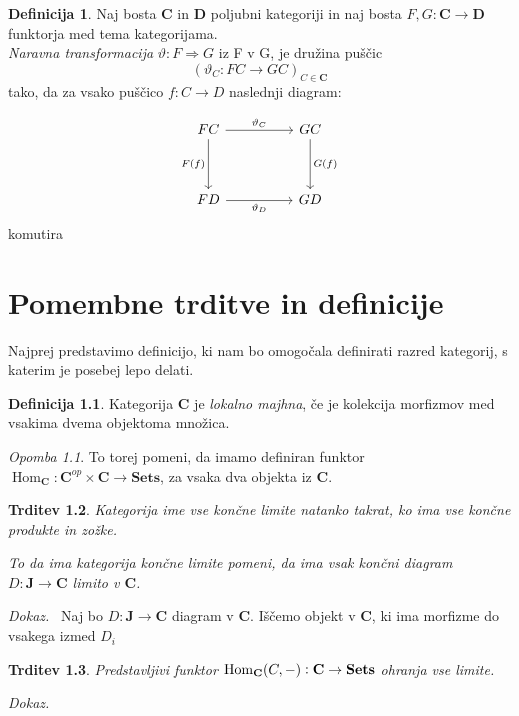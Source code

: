 \documentclass[12pt,a4paper]{book}
\theoremstyle{definition}
\newtheorem{definicija}{Definicija}[chapter]
\theoremstyle{plain}
\newtheorem{trditev}[definicija]{Trditev}
\newenvironment{dokaz}{\emph{Dokaz.}\ }{\hspace{\fill}{$\Box$}}
\theoremstyle{definition}
\theoremstyle{remark}
\newtheorem*{opomba}{Opomba}
\newcommand{\cat}[1]{\textbf{#1}}
\DeclareMathOperator{\Hom}{Hom}
\begin{document}
\begin{definicija}
Naj bosta $\cat{C}$ in $\cat{D}$ poljubni kategoriji in naj bosta $F,G : \cat{C} \to \cat{D}$ funktorja med tema kategorijama. \\
\textit{Naravna transformacija} $\vartheta : F \Rightarrow G$ iz F v G, je družina puščic 
$$(\vartheta_C : FC \to GC)_{C \in \cat{C}}$$
tako, da za vsako puščico $f : C \to D$ naslednji diagram:

\begin{equation}
\begin{tikzcd}[sep=huge]
FC \arrow[r, "\vartheta_C"] \arrow[d, "F(f)"'] & GC \arrow[d, "G(f)"] \\
FD \arrow[r, "\vartheta_D"'] & GD
\end{tikzcd}
\end{equation}
komutira
\end{definicija}


\chapter{Pomembne trditve in definicije}

Najprej predstavimo definicijo, ki nam bo omogočala definirati razred kategorij, s katerim je posebej lepo delati.
\begin{definicija}
Kategorija $\cat{C}$ je \emph{lokalno majhna}, če je kolekcija morfizmov med vsakima dvema objektoma množica.
\end{definicija}
\begin{opomba}
To torej pomeni, da imamo definiran funktor $\Hom_{\cat{C}} : \cat{C}^{op} \times \cat{C} \to \cat{Sets}$, za vsaka dva objekta iz $\cat{C}$.
\end{opomba}

\begin{trditev}
Kategorija ime vse \textit{končne limite} natanko takrat, ko ima vse končne produkte in zožke.

To da ima kategorija končne limite pomeni, da ima vsak končni diagram $D : \cat{J} \to \cat{C}$ limito v $\cat{C}$.

\end{trditev}
\begin{dokaz}
Naj bo $D : \cat{J} \to \cat{C}$ diagram v $\cat{C}$. Iščemo objekt v $\cat{C}$, ki ima morfizme do vsakega izmed $D_i$ 
\end{dokaz} 
 
\begin{trditev} Predstavljivi funktor $\Hom_{\bf{C}}(C,-): \bf{C} \to \bf{Sets}$ ohranja vse limite.
\end{trditev}
\begin{dokaz}

\end{dokaz}
\end{document}
